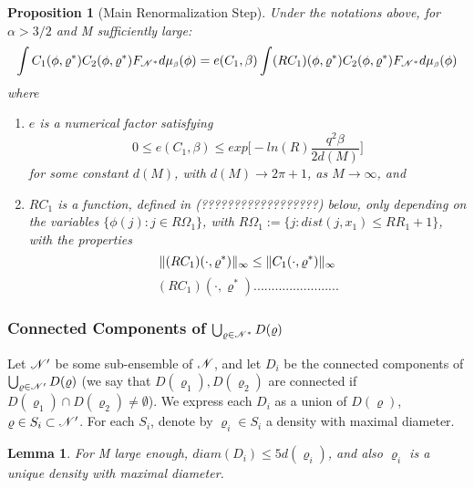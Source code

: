 \documentclass[11pt,reqno]{article}
\DeclarePairedDelimiter\norm{\lVert}{\rVert}%
\newtheorem{lemma}[thm]{Lemma}
\newtheorem{prop}[thm]{Proposition}
\theoremstyle{definition}
\begin{document}
\begin{prop}[Main Renormalization Step] \label{prop:prop44}
Under the notations above, for $\alpha > 3/2$ and M sufficiently large:
$$
\int C_1(\phi, \varrho^*) C_2(\phi, \varrho^*) F_{\mathscr{N}^*}d\mu_{\text{\tiny$\beta$}}(\phi) = 
e(C_1, \beta) \int (RC_1)(\phi, \varrho^*) C_2(\phi, \varrho^*) F_{\mathscr{N}^*}d\mu_{\text{\tiny$\beta$}}(\phi)
$$
where
\begin{enumerate}[label={\alph*)}]
\item $e$ is a numerical factor satisfying
$$
0 \leq e(C_1, \beta) \leq exp\Big[ -ln(R)\frac{q^2\beta}{2d(M)} \Big]
$$
for some constant $d(M)$, with $d(M) \rightarrow 2\pi+1$, as $M\rightarrow \infty$, and
\item $RC_1$ is a function, defined in (??????????????????) below, only depending on the variables $\{ \phi(j):j \in R\Omega_1 \}$, with $R\Omega_1 := \{ j: dist(j,x_1) \leq RR_1 + 1 \}$, with the properties
$$
\norm{(RC_1)(\cdot, \varrho^*)}_\infty \leq \norm{C_1(\cdot, \varrho^*)}_\infty
$$
$$
(RC_1)(\cdot, \varrho^*)........................
$$
\end{enumerate}
\end{prop}
\subsubsection{Connected Components of $\bigcup_{\varrho \in \mathscr{N}^*}D(\varrho)$}
Let $\mathscr{N}^\prime$ be some sub-ensemble of $\mathscr{N}$, and let $D_i$ be the connected components of $\bigcup_{\varrho \in \mathscr{N}^\prime}D(\varrho)$ (we say that $D(\varrho_1), D(\varrho_2)$ are connected if $D(\varrho_1)\cap D(\varrho_2)\neq\emptyset$). We express each $D_i$ as a union of $D(\varrho)$, $\varrho \in S_i \subset \mathscr{N}^\prime$. For each $S_i$, denote by $\varrho_i \in S_i$ a density with maximal diameter.
\begin{lemma}
For M large enough, $diam(D_i) \leq 5 d(\varrho_i)$, and also $\varrho_i$ is a unique density with maximal diameter.
\end{lemma}
\end{document}
